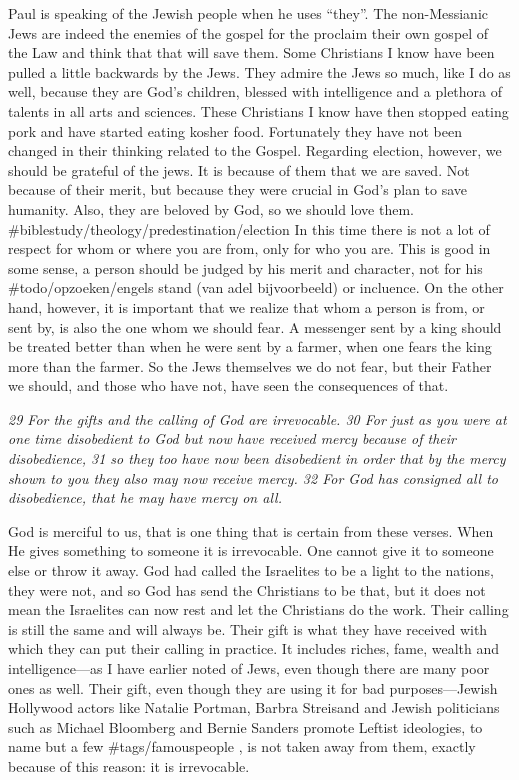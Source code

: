 Paul is speaking of the Jewish people when he uses ``they''. The
non-Messianic Jews are indeed the enemies of the gospel for the proclaim
their own gospel of the Law and think that that will save them. Some
Christians I know have been pulled a little backwards by the Jews. They
admire the Jews so much, like I do as well, because they are God's
children, blessed with intelligence and a plethora of talents in all
arts and sciences. These Christians I know have then stopped eating pork
and have started eating kosher food. Fortunately they have not been
changed in their thinking related to the Gospel. Regarding election,
however, we should be grateful of the jews. It is because of them that
we are saved. Not because of their merit, but because they were crucial
in God's plan to save humanity. Also, they are beloved by God, so we
should love them. \#biblestudy/theology/predestination/election In this
time there is not a lot of respect for whom or where you are from, only
for who you are. This is good in some sense, a person should be judged
by his merit and character, not for his \#todo/opzoeken/engels stand
(van adel bijvoorbeeld) or incluence. On the other hand, however, it is
important that we realize that whom a person is from, or sent by, is
also the one whom we should fear. A messenger sent by a king should be
treated better than when he were sent by a farmer, when one fears the
king more than the farmer. So the Jews themselves we do not fear, but
their Father we should, and those who have not, have seen the
consequences of that.

\emph{29 For the gifts and the calling of God are irrevocable. 30 For
just as you were at one time disobedient to God but now have received
mercy because of their disobedience, 31 so they too have now been
disobedient in order that by the mercy shown to you they also may now
receive mercy. 32 For God has consigned all to disobedience, that he may
have mercy on all.}

God is merciful to us, that is one thing that is certain from these
verses. When He gives something to someone it is irrevocable. One cannot
give it to someone else or throw it away. God had called the Israelites
to be a light to the nations, they were not, and so God has send the
Christians to be that, but it does not mean the Israelites can now rest
and let the Christians do the work. Their calling is still the same and
will always be. Their gift is what they have received with which they
can put their calling in practice. It includes riches, fame, wealth and
intelligence---as I have earlier noted of Jews, even though there are
many poor ones as well. Their gift, even though they are using it for
bad purposes---Jewish Hollywood actors like Natalie Portman, Barbra
Streisand and Jewish politicians such as Michael Bloomberg and Bernie
Sanders promote Leftist ideologies, to name but a few
\#tags/famouspeople , is not taken away from them, exactly because of
this reason: it is irrevocable.

